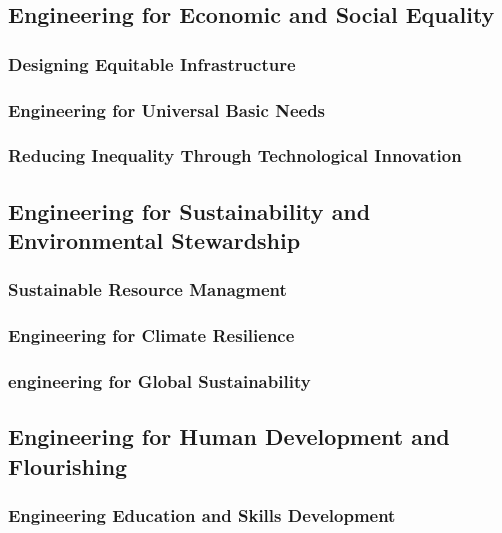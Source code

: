 \newpage

\subsection{Engineering for Economic and Social Equality}

\subsubsection{Designing Equitable Infrastructure}

\subsubsection{Engineering for Universal Basic Needs}

\subsubsection{Reducing Inequality Through Technological Innovation}

\newpage

\subsection{Engineering for Sustainability and Environmental Stewardship}

\subsubsection{Sustainable Resource Managment}

\subsubsection{Engineering for Climate Resilience}

\subsubsection{engineering for Global Sustainability}

\newpage

\subsection{Engineering for Human Development and Flourishing}

\subsubsection{Engineering Education and Skills Development}

